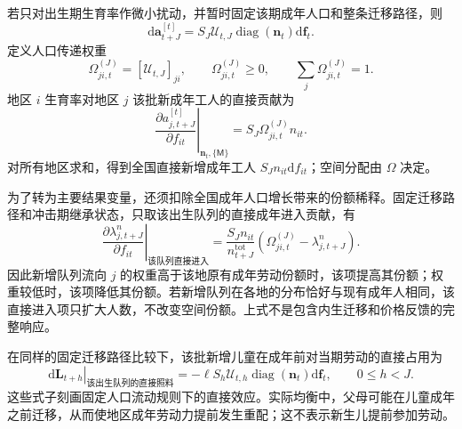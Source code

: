 \documentclass[UTF8,a4paper,zihao=-4,fontset=windows]{ctexart}
\numberwithin{equation}{section}
\newcommand{\dd}{\mathrm{d}}
\DeclareMathOperator{\diag}{diag}
\begin{document}
若只对出生期生育率作微小扰动，并暂时固定该期成年人口和整条迁移路径，则
\begin{equation}
 \dd\bm a_{t+J}^{[t]}
 =S_J\mathcal U_{t,J}\diag(\bm n_t)\dd\bm f_t.
 \label{eq:lg-birth-labor-direct}
\end{equation}
定义人口传递权重
\begin{equation}
 \Omega_{ji,t}^{(J)}=[\mathcal U_{t,J}]_{ji},\qquad
 \Omega_{ji,t}^{(J)}\geq0,\qquad\sum_j\Omega_{ji,t}^{(J)}=1.
\end{equation}
地区 $i$ 生育率对地区 $j$ 该批新成年工人的直接贡献为
\begin{equation}
 \left.\frac{\partial a_{j,t+J}^{[t]}}{\partial f_{it}}\right|_{\bm n_t,\{\mathsf M\}}
 =S_J\Omega_{ji,t}^{(J)}n_{it}.
 \label{eq:lg-spatial-birth-multiplier}
\end{equation}
对所有地区求和，得到全国直接新增成年工人 $S_Jn_{it}\dd f_{it}$；空间分配由 $\Omega$ 决定。

为了转为主要结果变量，还须扣除全国成年人口增长带来的份额稀释。固定迁移路径和冲击期继承状态，只取该出生队列的直接成年进入贡献，有
\begin{equation}
 \left.\frac{\partial\lambda^n_{j,t+J}}{\partial f_{it}}\right|_{\text{该队列直接进入}}
 =\frac{S_Jn_{it}}{n_{t+J}^{\mathrm{tot}}}
 \left(\Omega_{ji,t}^{(J)}-\lambda^n_{j,t+J}\right).
 \label{eq:lg-cohort-spatial-share-effect}
\end{equation}
因此新增队列流向 $j$ 的权重高于该地原有成年劳动份额时，该项提高其份额；权重较低时，该项降低其份额。若新增队列在各地的分布恰好与现有成年人相同，该直接进入项只扩大人数，不改变空间份额。上式不是包含内生迁移和价格反馈的完整响应。

在同样的固定迁移路径比较下，该批新增儿童在成年前对当期劳动的直接占用为
\begin{equation}
 \left.\dd\bm L_{t+h}\right|_{\text{该出生队列的直接照料}}
 =-\ell S_h\mathcal U_{t,h}\diag(\bm n_t)\dd\bm f_t,
 \qquad 0\leq h<J.
 \label{eq:lg-child-labor-displacement}
\end{equation}
这些式子刻画固定人口流动规则下的直接效应。实际均衡中，父母可能在儿童成年之前迁移，从而使地区成年劳动力提前发生重配；这不表示新生儿提前参加劳动。
\end{document}
